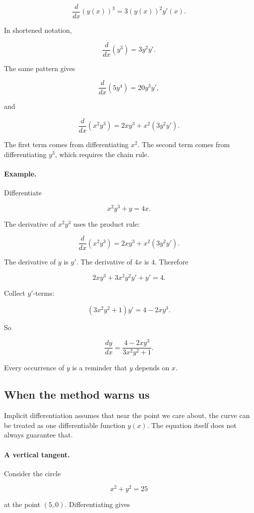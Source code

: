 \[
\frac{d}{dx}(y(x))^3
=
3(y(x))^2y'(x).
\]

In shortened notation,

\[
\frac{d}{dx}(y^3)=3y^2y'.
\]

The same pattern gives

\[
\frac{d}{dx}(5y^4)=20y^3y',
\]

and

\[
\frac{d}{dx}(x^2y^3)
=
2xy^3+x^2(3y^2y').
\]

The first term comes from differentiating \(x^2\).  The second term comes from differentiating \(y^3\), which requires the chain rule.

\paragraph{Example.}
Differentiate

\[
x^2y^3+y=4x.
\]

The derivative of \(x^2y^3\) uses the product rule:

\[
\frac{d}{dx}(x^2y^3)
=
2xy^3+x^2(3y^2y').
\]

The derivative of \(y\) is \(y'\).  The derivative of \(4x\) is \(4\).  Therefore

\[
2xy^3+3x^2y^2y'+y'=4.
\]

Collect \(y'\)-terms:

\[
(3x^2y^2+1)y'=4-2xy^3.
\]

So

\[
\boxed{
\frac{dy}{dx}
=
\frac{4-2xy^3}{3x^2y^2+1}.
}
\]

Every occurrence of \(y\) is a reminder that \(y\) depends on \(x\).

\subsection{When the method warns us}
\label{subsec:implicit-method-warnings}

Implicit differentiation assumes that near the point we care about, the curve can be treated as one differentiable function \(y(x)\).  The equation itself does not always guarantee that.

\paragraph{A vertical tangent.}
Consider the circle

\[
x^2+y^2=25
\]

at the point \((5,0)\).  Differentiating gives

